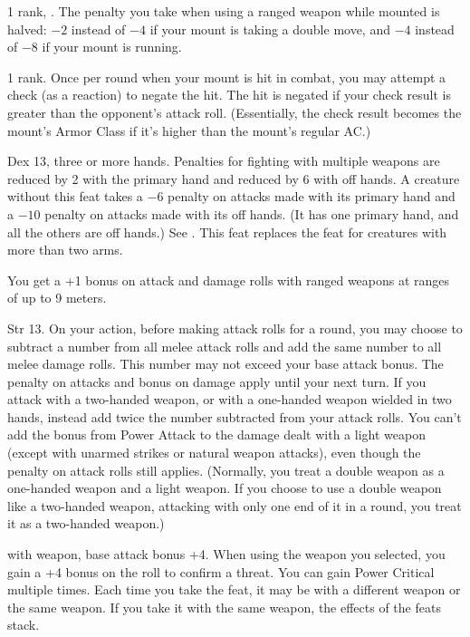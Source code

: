 { 1 rank, .}
{The penalty you take when using a ranged weapon while mounted is halved: $-2$ instead of $-4$ if your mount is taking a double move, and $-4$ instead of $-8$ if your mount is running.}

{ 1 rank.}
{Once per round when your mount is hit in combat, you may attempt a  check (as a reaction) to negate the hit. The hit is negated if your  check result is greater than the opponent's attack roll. (Essentially, the  check result becomes the mount's Armor Class if it's higher than the mount's regular AC.)}

{}
{Dex 13, three or more hands.}
{Penalties for fighting with multiple weapons are reduced by 2 with the primary hand and reduced by 6 with off hands.}
{A creature without this feat takes a $-6$ penalty on attacks made with its primary hand and a $-10$ penalty on attacks made with its off hands. (It has one primary hand, and all the others are off hands.) See .}
{This feat replaces the  feat for creatures with more than two arms.}

{}
{You get a +1 bonus on attack and damage rolls with ranged weapons at ranges of up to 9 meters.}

{}
{Str 13.}
{On your action, before making attack rolls for a round, you may choose to subtract a number from all melee attack rolls and add the same number to all melee damage rolls. This number may not exceed your base attack bonus. The penalty on attacks and bonus on damage apply until your next turn.}
{If you attack with a two-handed weapon, or with a one-handed weapon wielded in two hands, instead add twice the number subtracted from your attack rolls. You can't add the bonus from Power Attack to the damage dealt with a light weapon (except with unarmed strikes or natural weapon attacks), even though the penalty on attack rolls still applies. (Normally, you treat a double weapon as a one-handed weapon and a light weapon. If you choose to use a double weapon like a two-handed weapon, attacking with only one end of it in a round, you treat it as a two-handed weapon.)}{}

{}
{ with weapon, base attack bonus +4.}
{When using the weapon you selected, you gain a +4 bonus on the roll to confirm a threat.}
{}{You can gain Power Critical multiple times. Each time you take the feat, it may be with a different weapon or the same weapon. If you take it with the same weapon, the effects of the feats stack.}

